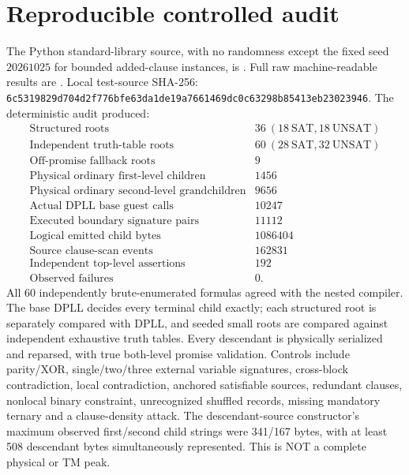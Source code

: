 \documentclass[11pt]{article}
\begin{document}
\section{Reproducible controlled audit}
The Python standard-library source, with no randomness except the fixed
seed $20261025$ for bounded added-clause instances, is
.
Full raw machine-readable results are
.
Local test-source SHA-256:
\texttt{6c5319829d704d2f776bfe63da1de19a7661469dc0c63298b85413eb23023946}.
The deterministic audit produced:
\[
\begin{array}{lr}
\text{Structured roots} & 36\ (18\ \mathrm{SAT},18\ \mathrm{UNSAT})\\
\text{Independent truth-table roots} &60\ (28\ \mathrm{SAT},32\ \mathrm{UNSAT})\\
\text{Off-promise fallback roots} &9\\
\text{Physical ordinary first-level children} &1456\\
\text{Physical ordinary second-level grandchildren} &9656\\
\text{Actual DPLL base guest calls} &10247\\
\text{Executed boundary signature pairs} &11112\\
\text{Logical emitted child bytes} &1086404\\
\text{Source clause-scan events} &162831\\
\text{Independent top-level assertions} &192\\
\text{Observed failures} &0.
\end{array}
\]
All 60 independently brute-enumerated formulas agreed with the nested
compiler. The base DPLL decides every terminal child exactly; each structured root is separately compared with DPLL, and seeded small roots are compared against independent exhaustive truth tables.
Every descendant is physically serialized and reparsed, with true
both-level promise validation. Controls include parity/XOR, single/two/three
external variable signatures, cross-block contradiction, local
contradiction, anchored satisfiable sources, redundant clauses,
nonlocal binary constraint, unrecognized shuffled records, missing
mandatory ternary and a clause-density attack.
The descendant-source constructor's maximum observed first/second
child strings were 341/167 bytes, with at least 508 descendant bytes
simultaneously represented. This is NOT a complete physical or TM peak.
\end{document}
